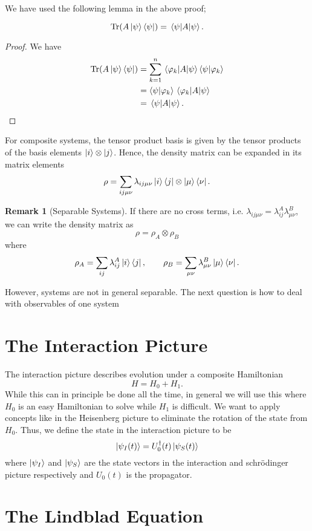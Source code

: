 \documentclass[twoside,symmetric, openany, 12pt]{./tuftebook}
\theoremstyle{definition}
\newtheorem{Remark}[Theorem]{Remark}
\theoremstyle{definition}
\theoremstyle{definition}
\begin{document}
We have used the following lemma in the above proof;
\begin{Lemma}
	\[
		\Tr(A \ket{\psi}\bra{\psi}) = \matrixelement{\psi}{A}{\psi}
	.\] 
\end{Lemma}
\begin{proof}
	We have
	\begin{align*}
	\Tr(A \ket{\psi}\bra{\psi}) &= \sum_{k=1}^n \matrixelement{\varphi_k}{A}{\psi}\braket{\psi}{\varphi_k}\\
					    &= \braket{\psi}{\varphi_k} \matrixelement{\varphi_k}{A}{\psi}\\
					    &= \matrixelement{\psi}{A}{\psi}.\qedhere
	\end{align*}
\end{proof}
\begin{Proposition}
	For composite systems, the tensor product basis is given by the tensor products of the basis elements $\ket{i} \otimes \ket{j}$. Hence, the density matrix can be expanded in its matrix elements
	\[
		\rho = \sum_{ij\mu\nu}\lambda_{ij\mu\nu} \ket{i}\bra{j}\otimes \ket{\mu}\bra{\nu}
	.\] 
\end{Proposition}
\begin{Remark}[Separable Systems]
	If there are no cross terms, i.e. $\lambda_{ij\mu\nu}=\lambda_{ij}^A\lambda_{\mu\nu}^B$, we can write the density matrix as
	\[
	\rho = \rho_A \otimes \rho_B
\]
where
\[
	\rho_A = \sum_{ij} \lambda_{ij}^A \ket{i}\bra{j},\qquad \rho_B = \sum_{\mu\nu} \lambda_{\mu\nu}^B \ket{\mu}\bra{\nu}
.\] 
\end{Remark}
However, systems are not in general separable. The next question is how to deal with observables of one system
\section{The Interaction Picture}
The interaction picture describes evolution under a composite Hamiltonian
\[
H=H_0+H_1
.\]
While this can in principle be done all the time, in general we will use this where $H_0$ is an easy Hamiltonian to solve while $H_1$ is difficult. We want to apply concepts like in the Heisenberg picture to eliminate the rotation of the state from $H_0$. Thus, we define the state in the interaction picture to be
\[
	\ket{\psi_I(t)} = U_0^\dagger(t)\ket{\psi_S(t)}
\]
where $\ket{\psi_I}$ and $\ket{\psi_S}$ are the state vectors in the interaction and schr\"{o}dinger picture respectively and $U_0(t)$ is the propagator.

\section{The Lindblad Equation}
\end{document}
